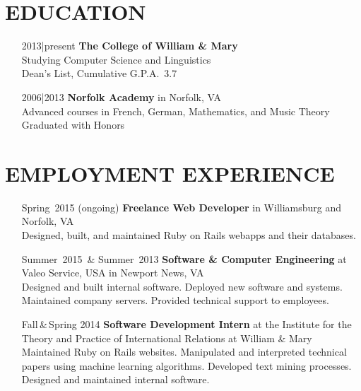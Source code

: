 \documentclass{res}     %
\begin{document}
\begin{resume}

\section{EDUCATION}          
\vspace{5mm}
\begin{itemize}[font=\itshape,align=parleft,labelwidth=3cm,leftmargin=2cm]
    \item[2013|present]
        \textbf{The College of William \& Mary}
        \\ Studying
        Computer Science and Linguistics %
        \\ Dean's List, Cumulative G.P.A.\ 3.7
    \item[2006|2013]
        \textbf{Norfolk Academy} in Norfolk, VA
        \\ Advanced courses in French, German, Mathematics, and Music Theory
        \\ Graduated with Honors
\end{itemize}

\section{EMPLOYMENT EXPERIENCE}
\vspace{5mm}
\begin{itemize}[font=\itshape,align=parleft,labelwidth=3cm,leftmargin=2cm]
    \item[Spring~2015 (ongoing)]
        \textbf{Freelance Web Developer}
        in Williamsburg and Norfolk, VA
        \vspace{1mm} \\
        Designed, built, and maintained Ruby on Rails webapps and their databases.
    \item[Summer~2015~\& Summer~2013]
        \textbf{Software \& Computer Engineering}
        at Valeo Service, USA
        in Newport News, VA
        \vspace{1mm} \\
        Designed and built internal software.
        Deployed new software and systems.
        Maintained company servers.
        Provided technical support to employees.
    \item[Fall\,\&\,Spring 2014]
        \textbf{Software Development Intern}
        at the Institute for the Theory and Practice of International Relations
        at William \& Mary
        \vspace{1mm} \\
        Maintained Ruby on Rails websites.
        Manipulated and interpreted technical papers using machine learning algorithms.
        Developed text mining processes.
        Designed and maintained internal software.
\end{itemize}


\end{resume}
\end{document}
